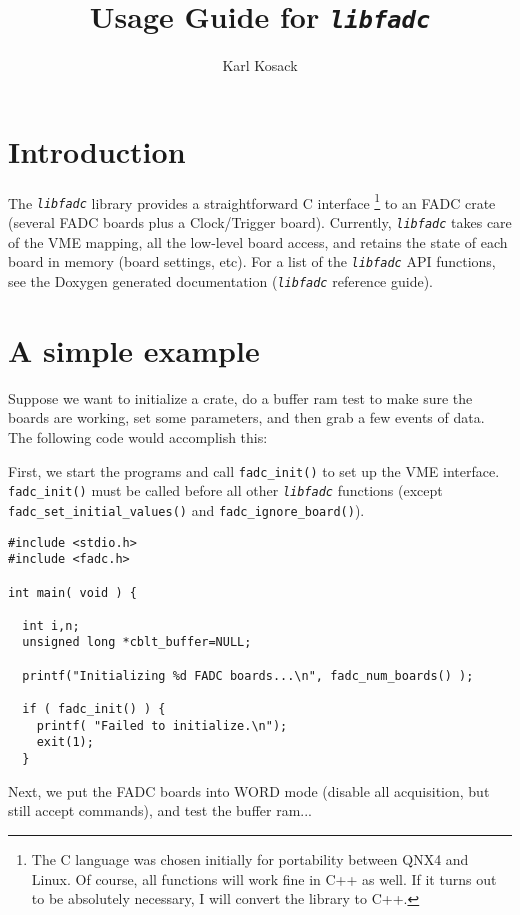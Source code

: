 \documentclass{article}
\newcommand{\libfadc}{\emph{\texttt{libfadc}} }
\newcommand{\F}[1]{\texttt{#1}}
\begin{document}
  

  \title{Usage Guide for \libfadc}
  \author{Karl Kosack}
  \maketitle
  \tableofcontents

\section{Introduction}

The \libfadc library provides a straightforward C interface
\footnote{The C language was chosen initially for portability between
QNX4 and Linux. Of course, all functions will work fine in C++ as
well. If it turns out to be absolutely necessary, I will convert the
library to C++.} to an FADC crate (several FADC boards plus a
Clock/Trigger board). Currently, \libfadc takes care of the VME
mapping, all the low-level board access, and retains the state of each
board in memory (board settings, etc).  For a list of the \libfadc API
functions, see the Doxygen generated documentation (\libfadc reference
guide).

\section{A simple example}

Suppose we want to initialize a crate, do a buffer ram test to make
sure the boards are working, set some parameters, and then grab a few
events of data.  The following code would accomplish this:

First, we start the programs and call \F{fadc\_init()} to set up the
VME interface.  \F{fadc\_init()} must be called before all other
\libfadc functions (except \F{fadc\_set\_initial\_values()} and \F{fadc\_ignore\_board()}).

\begin{verbatim}
#include <stdio.h>
#include <fadc.h>

int main( void ) {
  
  int i,n;
  unsigned long *cblt_buffer=NULL;

  printf("Initializing %d FADC boards...\n", fadc_num_boards() );

  if ( fadc_init() ) {
    printf( "Failed to initialize.\n");
    exit(1);
  }

\end{verbatim}

Next, we put the FADC boards into WORD mode (disable all acquisition,
but still accept commands), and test the buffer ram...
\end{document}
